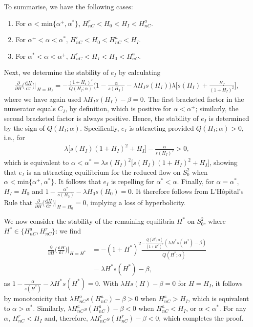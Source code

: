 \documentclass{article}
\theoremstyle{definition}
\numberwithin{equation}{section}
\newcommand{\dd}{\mathrm{d}}
\begin{document}
To summarise, we have the following cases:
\begin{enumerate}
    \item For $\alpha<\text{min}\{\alpha^+, \alpha^\ast\}$, $H_{nC}^r<H_0<H_I<H_{nC}^a$.
    \item For $\alpha^+<\alpha<\alpha^\ast$, $H_{nC}^r<H_0<H_{nC}^a<H_{I}$.
    \item For $\alpha^\ast<\alpha<\alpha^+$, $H_{nC}^r<H_I<H_0<H_{nC}^a$.
\end{enumerate}
Next, we determine the stability of $e_I$ by calculating
\begin{align*}
\frac{\partial}{\partial H}\Big(\frac{\dd H}{\dd\tau}\Big)\bigg\lvert_{H=H_I} =-\frac{(1+H_I)^2}{Q(H_I;\alpha)}\bigg(1-\frac{\alpha}{s(H_I)}-\lambda H_Is(H_I)\bigg)\lambda\bigg[s(H_I)+\frac{H_I}{(1+H_I)^2}\bigg],
\end{align*}
where we have again used $\lambda H_Is(H_I)-\beta=0$.
The first bracketed factor in the numerator equals $C_I$, by definition, which is positive for $\alpha<\alpha^+$; similarly, the second bracketed factor is always positive. Hence, the stability of $e_I$ is determined by the sign of $Q(H_I;\alpha)$. Specifically, $e_I$ is attracting provided $Q(H_I;\alpha)>0$, i.e., for
\begin{align*}
    \lambda \big[s(H_I)(1+H_I)^2+H_I\big]-\frac{\alpha}{s(H_I)^2}>0, 
\end{align*}
which is equivalent to $\alpha < \alpha^\ast=\lambda s(H_I)^2\big[s(H_I)(1+H_I)^2+H_I\big]$, showing that $e_I$ is an attracting equilibrium for the reduced flow on $S_0^2$ when $\alpha<\text{min}\{\alpha^+, \alpha^\ast\}$. It follows that $e_{I}$ is repelling for $\alpha^\ast<\alpha$. Finally, for $\alpha=\alpha^\ast$, $H_I=H_0$ and $1-\frac{\alpha^\ast}{s(H_0)}-\lambda H_0 s(H_0)=0$. It therefore follows from L'H\^opital's Rule that $\frac{\partial}{\partial H}\big(\frac{\dd H}{\dd\tau}\big)\big\lvert_{H=H_0}=0$, implying a loss of hyperbolicity.

We now consider the stability of the remaining equilibria $H^\ast$ on $S_0^2$, where $H^\ast\in\big\{H_{nC}^a, H_{nC}^r\big\}$: we find
\begin{align*}
\frac{\partial}{\partial H}\Big(\frac{\dd H}{\dd\tau}\Big)\bigg\lvert_{H=H^\ast} &=-(1+H^\ast)^2\frac{-\frac{Q(H^\ast;\alpha)}{(1+H^\ast)^2}(\lambda H^\ast s(H^\ast)-\beta)}{Q(H^\ast;\alpha)} \\
&=\lambda H^\ast s(H^\ast)-\beta,
\end{align*}
as $1-\frac{\alpha}{s(H^\ast)}-\lambda H^\ast s(H^\ast)=0$. With $\lambda H s(H)-\beta =0$ for $H=H_I$, it follows by monotonicity that $\lambda H_{nC}^a s(H_{nC}^a)-\beta>0$ when $H_{nC}^a>H_I$, which is equivalent to $\alpha>\alpha^\ast$. Similarly, $\lambda H_{nC}^a s(H_{nC}^a)-\beta<0$ when $H_{nC}^a<H_I$, or $\alpha<\alpha^\ast$. For any $\alpha$, $H_{nC}^r< H_I$ and, therefore, $\lambda H_{nC}^r s(H_{nC}^r)-\beta< 0$, which completes the proof. 
\end{document}

